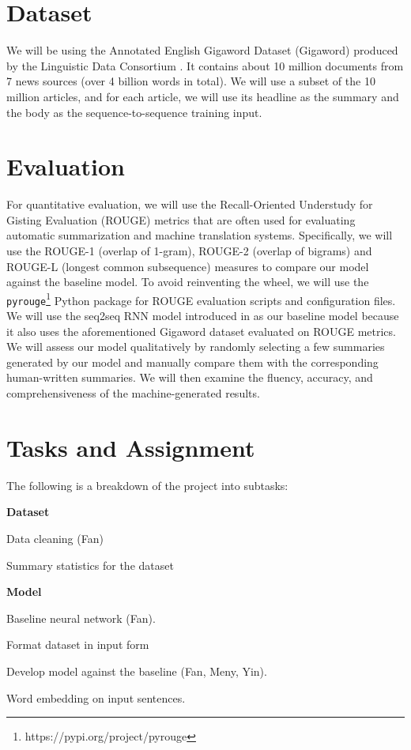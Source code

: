 \section{Dataset}
We will be using the Annotated English Gigaword Dataset (Gigaword) produced by the Linguistic Data Consortium \cite{napoles2012annotated}. It contains about 10 million documents from 7 news sources (over 4 billion words in total). We will use a subset of the 10 million articles, and for each article, we will use its headline as the summary and the body as the sequence-to-sequence training input.

\section{Evaluation}
For quantitative evaluation, we will use the Recall-Oriented Understudy for Gisting Evaluation (ROUGE) metrics that are often used for evaluating automatic summarization and machine translation systems. Specifically, we will use the ROUGE-1 (overlap of 1-gram), ROUGE-2 (overlap of bigrams) and ROUGE-L (longest common subsequence) measures to compare our model against the baseline model. To avoid reinventing the wheel, we will use the \texttt{pyrouge}\footnote{https://pypi.org/project/pyrouge} Python package for ROUGE evaluation scripts and configuration files. 
We will use the seq2seq RNN model introduced in \cite{nallapati2016abstractive} as our baseline model because it also uses the aforementioned Gigaword dataset evaluated on ROUGE metrics. We will assess our model qualitatively by randomly selecting a few summaries generated by our model and manually compare them with the corresponding human-written summaries. We will then examine the fluency, accuracy, and comprehensiveness of the machine-generated results.

\section{Tasks and Assignment}

The following is a breakdown of the project into subtasks:

\noindent
\textbf{Dataset}
\begin{compactitem}
\item Data cleaning (Fan)
\item Summary statistics for the dataset
\end{compactitem}

\noindent
\textbf{Model}
\begin{compactitem}
\item Baseline neural network (Fan).
\item Format dataset in input form 
\item Develop model against the baseline (Fan, Meny, Yin).
\item Word embedding on input sentences.
\end{compactitem}

